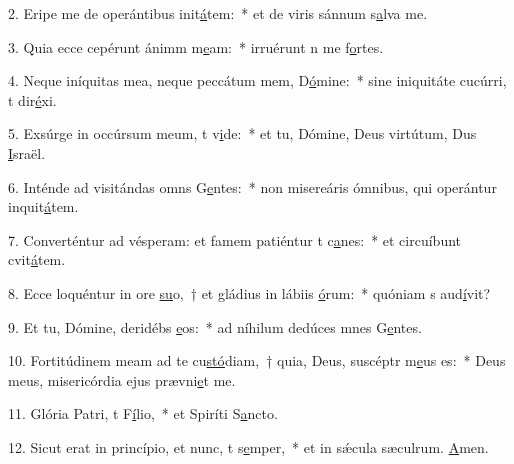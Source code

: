 2. Eripe me de operántibus init\uline{á}tem:~* et de viris sánnum s\uline{a}lva me.\par 
3. Quia ecce cepérunt ánimm m\uline{e}am:~* irruérunt n me f\uline{o}rtes.\par 
4. Neque iníquitas mea, neque peccátum mem, D\uline{ó}mine:~* sine iniquitáte cucúrri, t dir\uline{é}xi.\par 
5. Exsúrge in occúrsum meum, t v\uline{i}de:~* et tu, Dómine, Deus virtútum, Dus \uline{I}sraël.\par 
6. Inténde ad visitándas omns G\uline{e}ntes:~* non misereáris ómnibus, qui operántur inquit\uline{á}tem.\par 
7. Converténtur ad vésperam: et famem patiéntur t c\uline{a}nes:~* et circuíbunt cvit\uline{á}tem.\par 
8. Ecce loquéntur in ore \uline{su}o,~† et gládius in lábiis \uline{ó}rum:~* quóniam s aud\uline{í}vit?\par 
9. Et tu, Dómine, deridébs \uline{e}os:~* ad níhilum dedúces mnes G\uline{e}ntes.\par 
10. Fortitúdinem meam ad te cu\uline{stó}diam,~† quia, Deus, suscéptr m\uline{e}us es:~* Deus meus, misericórdia ejus prævni\uline{e}t me.\par 
11. Glória Patri, t F\uline{í}lio,~* et Spiríti S\uline{a}ncto.\par 
12. Sicut erat in princípio, et nunc, t s\uline{e}mper,~* et in sǽcula sæculrum. \uline{A}men.\par 
